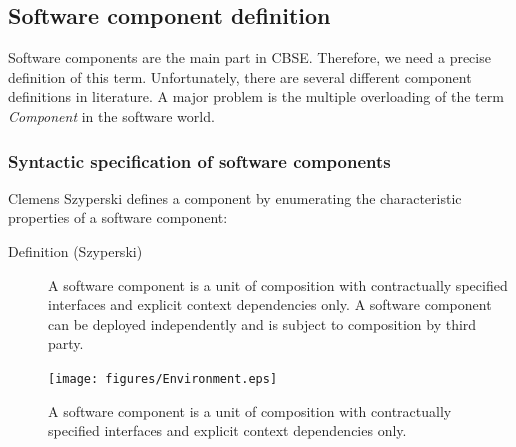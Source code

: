 
\subsection{Software component definition}

Software components are the main part in CBSE. Therefore, we need a precise 
definition of this term.
Unfortunately, there are several different component definitions in 
literature.
A major problem is the multiple overloading of the term {\it Component} in the 
software world.


\subsubsection{Syntactic specification of software components}

Clemens Szyperski \cite{Szyperski02} defines a component by enumerating the 
characteristic properties of a software component:
\begin{description} 
\item [Definition (Szyperski)] A software component is a unit of composition 
with contractually specified interfaces and explicit context dependencies only.
A software component can be deployed independently and is subject to composition
by third party.
\end{description}

\begin{figure}[htbp]
    \begin{center}
        \texttt{[image: figures/Environment.eps]}
        \caption{ A software component is a unit of composition 
	with contractually specified interfaces and explicit context 
	dependencies only.}
        \label{ComponentDef}
    \end{center}
\end{figure}

